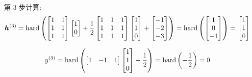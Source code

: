 \documentclass{article}
\begin{document}
第 3 步计算:
\begin{equation}
  \bm{h}^{(3)}
  =\operatorname{hard}\left(
    \begin{bmatrix}
      1 & 1 \\
      1 & 1 \\
      1 & 1 \\
    \end{bmatrix}
    \begin{bmatrix}
      1 \\ 0 \\
    \end{bmatrix}
    +\frac{1}{2}
    \begin{bmatrix}
      1 & 1 & 1 \\
      1 & 1 & 1 \\
      1 & 1 & 1 \\
    \end{bmatrix}
    \begin{bmatrix}
      1 \\ 1 \\ 0 \\
    \end{bmatrix}
    +
    \begin{bmatrix}
      -1 \\ -2 \\ -3 \\
    \end{bmatrix}
  \right)
  =\operatorname{hard}\left(
    \begin{bmatrix}
      1 \\ 0 \\ -1 \\
    \end{bmatrix}
  \right)
  =
  \begin{bmatrix}
    1 \\ 1 \\ 0 \\
  \end{bmatrix}
\end{equation}

\begin{equation}
  y^{(3)}
  =\operatorname{hard}\left(
    \begin{bmatrix}
      1 & -1 & 1 \\
    \end{bmatrix}
    \begin{bmatrix}
      1 \\ 1 \\ 0 \\
    \end{bmatrix}
    -\frac{1}{2}
  \right)
  =\operatorname{hard}\left(
    -\frac{1}{2}
  \right)
  =0
\end{equation}
\end{document}
